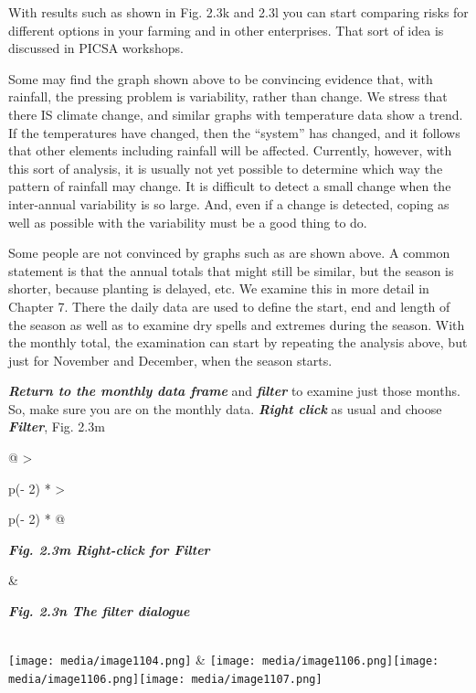 \documentclass[
  letterpaper,
  DIV=11,
  numbers=noendperiod]{scrreprt}
\begin{document}
With results such as shown in Fig. 2.3k and 2.3l you can start comparing
risks for different options in your farming and in other enterprises.
That sort of idea is discussed in PICSA workshops.

Some may find the graph shown above to be convincing evidence that, with
rainfall, the pressing problem is variability, rather than change. We
stress that there IS climate change, and similar graphs with temperature
data show a trend. If the temperatures have changed, then the ``system''
has changed, and it follows that other elements including rainfall will
be affected. Currently, however, with this sort of analysis, it is
usually not yet possible to determine which way the pattern of rainfall
may change. It is difficult to detect a small change when the
inter-annual variability is so large. And, even if a change is detected,
coping as well as possible with the variability must be a good thing to
do.

Some people are not convinced by graphs such as are shown above. A
common statement is that the annual totals that might still be similar,
but the season is shorter, because planting is delayed, etc. We examine
this in more detail in Chapter 7. There the daily data are used to
define the start, end and length of the season as well as to examine dry
spells and extremes during the season. With the monthly total, the
examination can start by repeating the analysis above, but just for
November and December, when the season starts.

\textbf{\emph{Return to the monthly data frame}} and
\textbf{\emph{filter}} to examine just those months. So, make sure you
are on the monthly data. \textbf{\emph{Right click}} as usual and choose
\textbf{\emph{Filter}}, Fig. 2.3m

\begin{longtable}[]{@{}
  >{\raggedright\arraybackslash}p{(\columnwidth - 2\tabcolsep) * }
  >{\raggedright\arraybackslash}p{(\columnwidth - 2\tabcolsep) * }@{}}
\toprule\noalign{}
\begin{minipage}[b]{\linewidth}\raggedright
\textbf{\emph{Fig. 2.3m Right-click for Filter}}
\end{minipage} & \begin{minipage}[b]{\linewidth}\raggedright
\textbf{\emph{Fig. 2.3n The filter dialogue}}
\end{minipage} \\
\midrule\noalign{}
\endhead
\bottomrule\noalign{}
\endlastfoot
\texttt{[image: media/image1104.png]}
&
\texttt{[image: media/image1106.png]}\texttt{[image: media/image1106.png]}\texttt{[image: media/image1107.png]} \\
\end{longtable}
\end{document}
